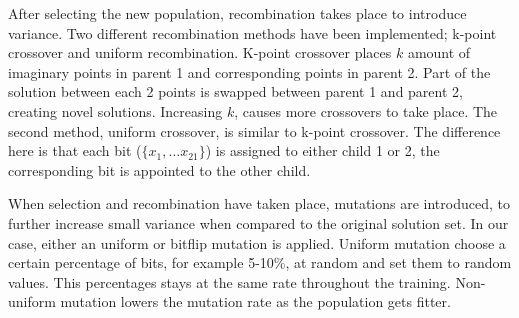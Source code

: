 \documentclass{article}
\begin{document}
After selecting the new population, recombination takes place to introduce variance. 
Two different recombination methods have been implemented; k-point crossover and uniform recombination.
K-point crossover places $k$ amount of imaginary points in parent 1 and corresponding points in parent 2. 
Part of the solution between each 2 points is swapped between parent 1 and parent 2, creating novel solutions. 
Increasing $k$, causes more crossovers to take place. 
The second method, uniform crossover, is similar to k-point crossover. 
The difference here is that each bit ($\{x_1, \dots x_{21}\}$) is assigned to either child 1 or 2, the corresponding bit is appointed to the other child. 

When selection and recombination have taken place, mutations are introduced, to further increase small variance when compared to the original solution set.
In our case, either an uniform or bitflip mutation is applied.
Uniform mutation choose a certain percentage of bits, for example 5-10\%, at random and set them to random values. 
This percentages stays at the same rate throughout the training. 
Non-uniform mutation lowers the mutation rate as the population gets fitter.
\end{document}
